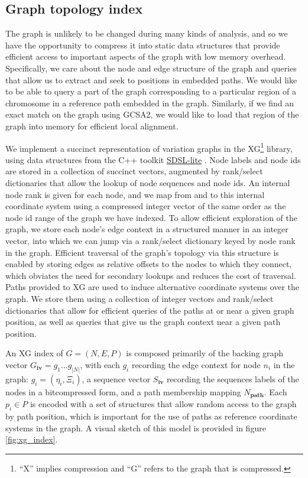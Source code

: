 \subsection{Graph topology index}
\label{sec:graph_topology_index}

The graph is unlikely to be changed during many kinds of analysis, and so we have the opportunity to compress it into static data structures that provide efficient access to important aspects of the graph with low memory overhead.
Specifically, we care about the node and edge structure of the graph and queries that allow us to extract and seek to positions in embedded paths.
We would like to be able to query a part of the graph corresponding to a particular region of a chromosome in a reference path embedded in the graph.
Similarly, if we find an exact match on the graph using GCSA2, we would like to load that region of the graph into memory for efficient local alignment.

We implement a succinct representation of variation graphs in the XG\footnote{``X'' implies compression and ``G'' refers to the graph that is compressed.} library, using data structures from the C++ toolkit \href{https://github.com/simongog/sdsl-lite}{SDSL-lite} \cite{gbmp2014sea}.
Node labels and node ids are stored in a collection of succinct vectors, augmented by rank/select dictionaries that allow the lookup of node sequences and node ids.
An internal node rank is given for each node, and we map from and to this internal coordinate system using a compressed integer vector of the same order as the node id range of the graph we have indexed.
To allow efficient exploration of the graph, we store each node's edge context in a structured manner in an integer vector, into which we can jump via a rank/select dictionary keyed by node rank in the graph.
Efficient traversal of the graph's topology via this structure is enabled by storing edges as relative offsets to the nodes to which they connect, which obviates the need for secondary lookups and reduces the cost of traversal.
Paths provided to XG are used to induce alternative coordinate systems over the graph. 
We store them using a collection of integer vectors and rank/select dictionaries that allow for efficient queries of the paths at or near a given graph position, as well as queries that give us the graph context near a given path position.

An XG index of $G = (N, E, P)$ is composed primarily of the backing graph vector $G_\textbf{iv} = g_1 \ldots g_{|N|}$, with each $g_i$ recording the edge context for node $n_i$ in the graph: $g_i = ( \eta_i, \Xi_i)$, a sequence vector $S_\textbf{iv}$ recording the sequences labels of the nodes in a bitcompressed form, and a path membership mapping $N_\textbf{path}$.
Each $p_i \in P$ is encoded with a set of structures that allow random access to the graph by path position, which is important for the use of paths as reference coordinate systems in the graph.
A visual sketch of this model is provided in figure \ref{fig:xg_index}.

